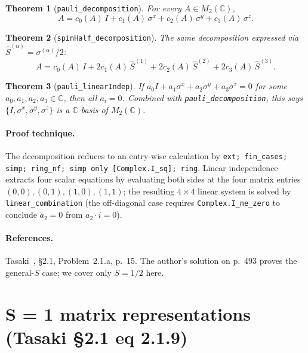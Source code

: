 \documentclass[a4paper,11pt]{article}
\newtheorem{theorem}{Theorem}
\begin{document}
\begin{theorem}[\texttt{pauli\_decomposition}]
For every $A \in M_2(\mathbb{C})$,
\[
  A = c_0(A)\,I + c_1(A)\,\sigma^x + c_2(A)\,\sigma^y
      + c_3(A)\,\sigma^z.
\]
\end{theorem}

\begin{theorem}[\texttt{spinHalf\_decomposition}]
The same decomposition expressed via $\hat S^{(\alpha)} =
\sigma^{(\alpha)}/2$:
\[
  A = c_0(A)\,I + 2 c_1(A)\,\hat S^{(1)}
      + 2 c_2(A)\,\hat S^{(2)} + 2 c_3(A)\,\hat S^{(3)}.
\]
\end{theorem}

\begin{theorem}[\texttt{pauli\_linearIndep}]
If $a_0 I + a_1 \sigma^x + a_2 \sigma^y + a_3 \sigma^z = 0$ for some
$a_0, a_1, a_2, a_3 \in \mathbb{C}$, then all $a_i = 0$. Combined with
\texttt{pauli\_decomposition}, this says $\{I, \sigma^x, \sigma^y,
\sigma^z\}$ is a $\mathbb{C}$-basis of $M_2(\mathbb{C})$.
\end{theorem}

\paragraph{Proof technique.}
The decomposition reduces to an entry-wise calculation by
\texttt{ext; fin\_cases; simp; ring\_nf; simp only [Complex.I\_sq]; ring}.
Linear independence extracts four scalar equations by evaluating both
sides at the four matrix entries $(0,0), (0,1), (1,0), (1,1)$; the
resulting $4 \times 4$ linear system is solved by
\texttt{linear\_combination} (the off-diagonal case requires
\texttt{Complex.I\_ne\_zero} to conclude $a_2 = 0$ from
$a_2 \cdot i = 0$).

\paragraph{References.}
Tasaki~\cite{Tasaki:QMB}, §2.1, Problem~2.1.a, p.~15.
The author's solution on p.~493 proves the general-$S$ case; we cover
only $S = 1/2$ here.

\section{S = 1 matrix representations (Tasaki §2.1 eq 2.1.9)}
\label{sec:spinone}
\end{document}
